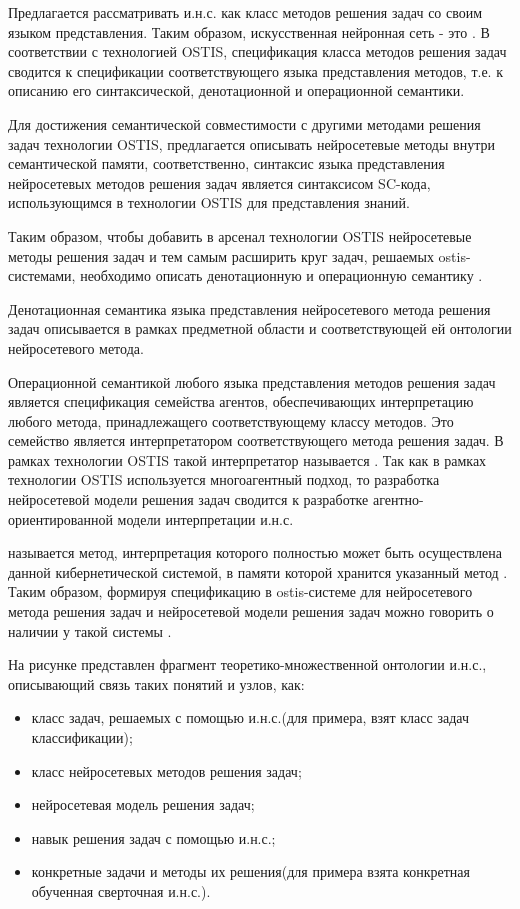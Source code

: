 Предлагается рассматривать и.н.с. как класс методов решения задач со своим языком представления. Таким образом, искусственная нейронная сеть - это . В соответствии с технологией OSTIS, спецификация класса методов решения задач сводится к спецификации соответствующего языка представления методов, т.е. к описанию его синтаксической, денотационной и операционной семантики.

Для достижения семантической совместимости с другими методами решения задач технологии OSTIS, предлагается описывать нейросетевые методы внутри семантической памяти, соответственно, синтаксис языка представления нейросетевых методов решения задач является синтаксисом SC-кода, использующимся в технологии OSTIS для представления знаний.

Таким образом, чтобы добавить в арсенал технологии OSTIS нейросетевые методы решения задач и тем самым расширить круг задач, решаемых ostis-системами, необходимо описать денотационную и операционную семантику .

Денотационная семантика языка представления нейросетевого метода решения задач описывается в рамках предметной области и соответствующей ей онтологии нейросетевого метода.

Операционной семантикой любого языка представления методов решения задач является спецификация семейства агентов, обеспечивающих интерпретацию любого метода, принадлежащего соответствующему классу методов. Это семейство является интерпретатором соответствующего метода решения задач. В рамках технологии OSTIS такой интерпретатор называется . Так как в рамках технологии OSTIS используется многоагентный подход, то разработка нейросетевой модели решения задач сводится к разработке агентно-ориентированной модели интерпретации и.н.с.

 называется метод, интерпретация которого полностью может быть осуществлена данной кибернетической системой, в памяти которой хранится указанный метод . Таким образом, формируя спецификацию в ostis-системе для нейросетевого метода решения задач и нейросетевой модели решения задач можно говорить о наличии у такой системы .

На рисунке  представлен фрагмент теоретико-множественной онтологии и.н.с., описывающий связь таких понятий и узлов, как:
\begin{itemize}
	\item класс задач, решаемых с помощью и.н.с.(для примера, взят класс задач классификации);
	\item класс нейросетевых методов решения задач;
	\item нейросетевая модель решения задач;
	\item навык решения задач с помощью и.н.с.;
	\item конкретные задачи и методы их решения(для примера взята конкретная обученная сверточная и.н.с.).
\end{itemize}

